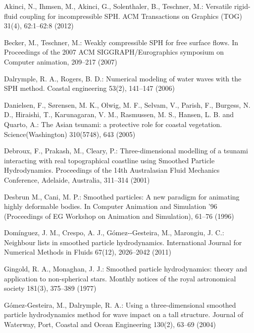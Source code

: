 \documentclass{llncs}
\begin{document}
\begin{thebibliography}{14}

 Akinci, N., Ihmsen, M., Akinci, G., Solenthaler, B.,
  Teschner, M.: Versatile rigid-fluid coupling for incompressible SPH. ACM Transactions on
  Graphics (TOG) 31(4), 62:1--62:8 (2012)

 Becker, M., Teschner, M.: Weakly compressible SPH for free
  surface flows. In Proceedings of the 2007 ACM SIGGRAPH/Eurographics symposium on
  Computer animation, 209--217 (2007)

 Dalrymple, R. A., Rogers, B. D.: Numerical modeling of water waves
  with the SPH method. Coastal engineering 53(2), 141--147 (2006)

 Danielsen, F., S{\o}rensen, M. K., Olwig, M. F., Selvam, V.,
  Parish, F., Burgess, N. D., Hiraishi, T., Karunagaran, V. M., Rasmussen, M. S., Hansen,
  L. B. and Quarto, A.: The Asian tsunami: a protective role for coastal
  vegetation. Science(Washington) 310(5748), 643 (2005)

 Debroux, F., Prakash, M., Cleary, P.: Three-dimensional
  modelling of a tsunami interacting with real topographical coastline using Smoothed
  Particle Hydrodynamics. Proceedings of the 14th Australasian Fluid Mechanics Conference,
  Adelaide, Australia, 311--314 (2001)

 Desbrun M., Cani, M. P.: Smoothed particles: A new paradigm
  for animating highly deformable bodies. In Computer Animation and Simulation ’96
  (Proceedings of EG Workshop on Animation and Simulation), 61--76 (1996)

 Dom\'{i}nguez, J. M., Crespo, A. J., G\'{o}mez-‐Gesteira, M.,
  Marongiu, J. C.: Neighbour lists in smoothed particle hydrodynamics. International
  Journal for Numerical Methods in Fluids 67(12), 2026--2042 (2011)

 Gingold, R. A., Monaghan, J. J.: Smoothed particle hydrodynamics:
  theory and application to non-spherical stars. Monthly notices of the royal astronomical
  society 181(3), 375--389 (1977)

 G\'{o}mez-Gesteira, M., Dalrymple, R. A.: Using a three-dimensional
  smoothed particle hydrodynamics method for wave impact on a tall structure. Journal of
  Waterway, Port, Coastal and Ocean Engineering 130(2), 63--69 (2004)


\end{thebibliography}
\end{document}
